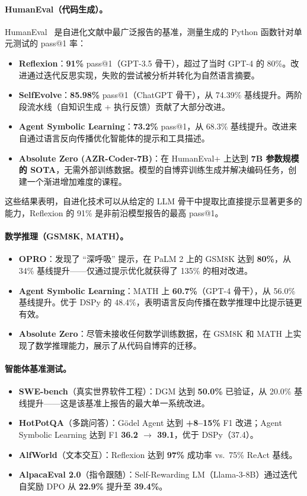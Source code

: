\paragraph{HumanEval（代码生成）。}
HumanEval~\citep{chen2021humaneval} 是自进化文献中最广泛报告的基准，测量生成的 Python 函数针对单元测试的 pass@1 率：
\begin{itemize}
    \item \textbf{Reflexion}：\textbf{91\%} pass@1（GPT-3.5 骨干），超过了当时 GPT-4 的 80\%。改进通过迭代反思实现，失败的尝试被分析并转化为自然语言摘要。
    \item \textbf{SelfEvolve}：\textbf{85.98\%} pass@1（ChatGPT 骨干），从 74.39\% 基线提升。两阶段流水线（自知识生成 + 执行反馈）贡献了大部分改进。
    \item \textbf{Agent Symbolic Learning}：\textbf{73.2\%} pass@1，从 68.3\% 基线提升。改进来自通过语言反向传播优化智能体的提示和工具描述。
    \item \textbf{Absolute Zero (AZR-Coder-7B)}：在 HumanEval+ 上达到 \textbf{7B 参数规模的 SOTA}，无需外部训练数据。模型的自博弈训练生成并解决编码任务，创建一个渐进增加难度的课程。
\end{itemize}
这些结果表明，自进化技术可以从给定的 LLM 骨干中提取比直接提示显著更多的能力，Reflexion 的 91\% 是非前沿模型报告的最高 pass@1。

\paragraph{数学推理（GSM8K, MATH）。}
\begin{itemize}
    \item \textbf{OPRO}：发现了 ``深呼吸'' 提示，在 PaLM 2 上的 GSM8K 达到 \textbf{80\%}，从 34\% 基线提升——仅通过提示优化就获得了 135\% 的相对改进。
    \item \textbf{Agent Symbolic Learning}：MATH 上 \textbf{60.7\%}（GPT-4 骨干），从 56.0\% 基线提升。优于 DSPy 的 48.4\%，表明语言反向传播在数学推理中比提示链更有效。
    \item \textbf{Absolute Zero}：尽管未接收任何数学训练数据，在 GSM8K 和 MATH 上实现了数学推理能力，展示了从代码自博弈的迁移。
\end{itemize}

\paragraph{智能体基准测试。}
\begin{itemize}
    \item \textbf{SWE-bench}（真实世界软件工程）：DGM 达到 \textbf{50.0\%} 已验证，从 20.0\% 基线提升——这是该基准上报告的最大单一系统改进。
    \item \textbf{HotPotQA}（多跳问答）：G\"{o}del Agent 达到 \textbf{+8--15\%} F1 改进；Agent Symbolic Learning 达到 F1 \textbf{36.2 $\rightarrow$ 39.1}，优于 DSPy（37.4）。
    \item \textbf{AlfWorld}（文本交互）：Reflexion 达到 \textbf{97\%} 成功率 vs.\ 75\% ReAct 基线。
    \item \textbf{AlpacaEval 2.0}（指令跟随）：Self-Rewarding LM（Llama-3-8B）通过迭代自奖励 DPO 从 \textbf{22.9\%} 提升至 \textbf{39.4\%}。
\end{itemize}

